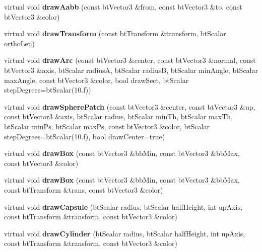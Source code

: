 \begin{DoxyCompactItemize}
virtual void {\bfseries draw\+Aabb} (const bt\+Vector3 \&from, const bt\+Vector3 \&to, const bt\+Vector3 \&color)
\item 
\mbox{\label{classbtIDebugDraw_a6faa8214eebc450104325b6833448b1e}} 
virtual void {\bfseries draw\+Transform} (const bt\+Transform \&transform, bt\+Scalar ortho\+Len)
\item 
\mbox{\label{classbtIDebugDraw_a19cd036ce23c673c4ac13cc3f2a5ac33}} 
virtual void {\bfseries draw\+Arc} (const bt\+Vector3 \&center, const bt\+Vector3 \&normal, const bt\+Vector3 \&axis, bt\+Scalar radiusA, bt\+Scalar radiusB, bt\+Scalar min\+Angle, bt\+Scalar max\+Angle, const bt\+Vector3 \&color, bool draw\+Sect, bt\+Scalar step\+Degrees=bt\+Scalar(10.f))
\item 
\mbox{\label{classbtIDebugDraw_aaa3510d1efce41e4a98915ef542c4288}} 
virtual void {\bfseries draw\+Sphere\+Patch} (const bt\+Vector3 \&center, const bt\+Vector3 \&up, const bt\+Vector3 \&axis, bt\+Scalar radius, bt\+Scalar min\+Th, bt\+Scalar max\+Th, bt\+Scalar min\+Ps, bt\+Scalar max\+Ps, const bt\+Vector3 \&color, bt\+Scalar step\+Degrees=bt\+Scalar(10.f), bool draw\+Center=true)
\item 
\mbox{\label{classbtIDebugDraw_a9c9e46fa03d6296f8b3f57538db6be7f}} 
virtual void {\bfseries draw\+Box} (const bt\+Vector3 \&bb\+Min, const bt\+Vector3 \&bb\+Max, const bt\+Vector3 \&color)
\item 
\mbox{\label{classbtIDebugDraw_a1895c36d90017439329ad2b375c92285}} 
virtual void {\bfseries draw\+Box} (const bt\+Vector3 \&bb\+Min, const bt\+Vector3 \&bb\+Max, const bt\+Transform \&trans, const bt\+Vector3 \&color)
\item 
\mbox{\label{classbtIDebugDraw_aec2ac4fe5ee1073a2eeb7f459a22dd87}} 
virtual void {\bfseries draw\+Capsule} (bt\+Scalar radius, bt\+Scalar half\+Height, int up\+Axis, const bt\+Transform \&transform, const bt\+Vector3 \&color)
\item 
\mbox{\label{classbtIDebugDraw_aa0f2076c26f158ba5579a07a931fabd6}} 
virtual void {\bfseries draw\+Cylinder} (bt\+Scalar radius, bt\+Scalar half\+Height, int up\+Axis, const bt\+Transform \&transform, const bt\+Vector3 \&color)

\end{DoxyCompactItemize}
